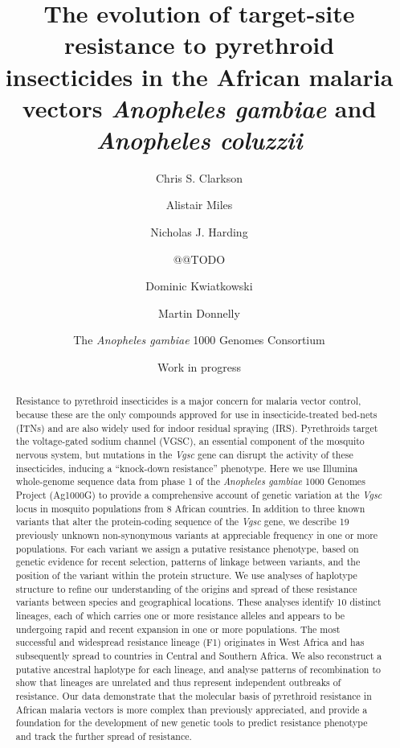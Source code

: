 \documentclass[a4paper,11pt,abstracton]{scrartcl}
\title{
The evolution of target-site resistance to pyrethroid insecticides in the African malaria vectors \emph{Anopheles gambiae} and \emph{Anopheles coluzzii}
}
\date{Work in progress}
\author[1]{Chris S. Clarkson}
\author[2,1]{Alistair Miles}
\author[2]{Nicholas J. Harding}
\author{@@TODO}
\author[1,2]{Dominic Kwiatkowski}
\author[3,1]{Martin Donnelly}
\author[4]{The \emph{Anopheles gambiae} 1000 Genomes Consortium}
\affil[1]{Sanger @@TODO}
\affil[2]{Oxford @@TODO}
\affil[3]{Liverpool @@TODO}
\affil[4]{MalariaGEN @@TODO}
\begin{document}
\maketitle


\begin{abstract}

Resistance to pyrethroid insecticides is a major concern for malaria vector control, because these are the only compounds approved for use in insecticide-treated bed-nets (ITNs) and are also widely used for indoor residual spraying (IRS). 
%
Pyrethroids target the voltage-gated sodium channel (VGSC), an essential component of the mosquito nervous system, but mutations in the \emph{Vgsc} gene can disrupt the activity of these insecticides, inducing a ``knock-down resistance'' phenotype. 
%
Here we use Illumina whole-genome sequence data from phase 1 of the \emph{Anopheles gambiae} 1000 Genomes Project (Ag1000G) to provide a comprehensive account of genetic variation at the \emph{Vgsc} locus in mosquito populations from 8 African countries.
%
In addition to three known variants that alter the protein-coding sequence of the \emph{Vgsc} gene, we describe 19 previously unknown non-synonymous variants at appreciable frequency in one or more populations.
%
For each variant we assign a putative resistance phenotype, based on genetic evidence for recent selection, patterns of linkage between variants, and the position of the variant within the protein structure.
%
We use analyses of haplotype structure to refine our understanding of the origins and spread of these resistance variants between species and geographical locations.
%
These analyses identify 10 distinct lineages, each of which carries one or more resistance alleles and appears to be undergoing rapid and recent expansion in one or more populations.
%
The most successful and widespread resistance lineage (F1) originates in West Africa and has subsequently spread to countries in Central and Southern Africa.
%
We also reconstruct a putative ancestral haplotype for each lineage, and analyse patterns of recombination to show that lineages are unrelated and thus represent independent outbreaks of resistance.
%
Our data demonstrate that the molecular basis of pyrethroid resistance in African malaria vectors is more complex than previously appreciated, and provide a foundation for the development of new genetic tools to predict resistance phenotype and track the further spread of resistance.

\end{abstract}
\end{document}
